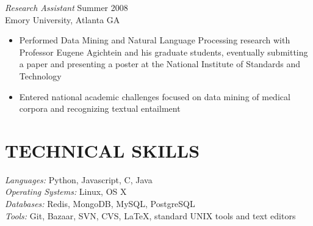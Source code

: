 \documentclass[line,margin]{res}
\begin{document}
\begin{resume}
        {\sl Research Assistant} \hfill Summer 2008 \\
        Emory University, Atlanta GA
        \begin{itemize}
        \item Performed Data Mining and Natural Language Processing research
          with Professor Eugene Agichtein and his graduate students,
          eventually submitting a paper and presenting a poster at the National
          Institute of Standards and Technology
        \item Entered national academic challenges focused on data
          mining of medical corpora and recognizing textual entailment
        \end{itemize}

\section{TECHNICAL SKILLS}
        {\sl Languages:} Python, Javascript, C, Java \\
        {\sl Operating Systems:} Linux, OS X\\
        {\sl Databases:} Redis, MongoDB, MySQL, PostgreSQL \\
        {\sl Tools:} Git, Bazaar, SVN, CVS, \LaTeX, standard UNIX tools and
        text editors 

\end{resume}
\end{document}
